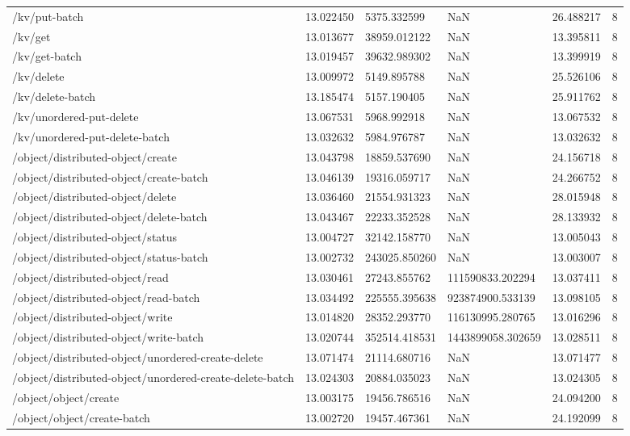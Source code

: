 \begin{tabularx}{\linewidth}{XXXXXX}
/kv/put-batch & 13.022450 & 5375.332599 & NaN & 26.488217 & 8 \\
/kv/get & 13.013677 & 38959.012122 & NaN & 13.395811 & 8 \\
/kv/get-batch & 13.019457 & 39632.989302 & NaN & 13.399919 & 8 \\
/kv/delete & 13.009972 & 5149.895788 & NaN & 25.526106 & 8 \\
/kv/delete-batch & 13.185474 & 5157.190405 & NaN & 25.911762 & 8 \\
/kv/unordered-put-delete & 13.067531 & 5968.992918 & NaN & 13.067532 & 8 \\
/kv/unordered-put-delete-batch & 13.032632 & 5984.976787 & NaN & 13.032632 & 8 \\
/object/distributed-object/create & 13.043798 & 18859.537690 & NaN & 24.156718 & 8 \\
/object/distributed-object/create-batch & 13.046139 & 19316.059717 & NaN & 24.266752 & 8 \\
/object/distributed-object/delete & 13.036460 & 21554.931323 & NaN & 28.015948 & 8 \\
/object/distributed-object/delete-batch & 13.043467 & 22233.352528 & NaN & 28.133932 & 8 \\
/object/distributed-object/status & 13.004727 & 32142.158770 & NaN & 13.005043 & 8 \\
/object/distributed-object/status-batch & 13.002732 & 243025.850260 & NaN & 13.003007 & 8 \\
/object/distributed-object/read & 13.030461 & 27243.855762 & 111590833.202294 & 13.037411 & 8 \\
/object/distributed-object/read-batch & 13.034492 & 225555.395638 & 923874900.533139 & 13.098105 & 8 \\
/object/distributed-object/write & 13.014820 & 28352.293770 & 116130995.280765 & 13.016296 & 8 \\
/object/distributed-object/write-batch & 13.020744 & 352514.418531 & 1443899058.302659 & 13.028511 & 8 \\
/object/distributed-object/unordered-create-delete & 13.071474 & 21114.680716 & NaN & 13.071477 & 8 \\
/object/distributed-object/unordered-create-delete-batch & 13.024303 & 20884.035023 & NaN & 13.024305 & 8 \\
/object/object/create & 13.003175 & 19456.786516 & NaN & 24.094200 & 8 \\
/object/object/create-batch & 13.002720 & 19457.467361 & NaN & 24.192099 & 8 \\

\end{tabularx}
